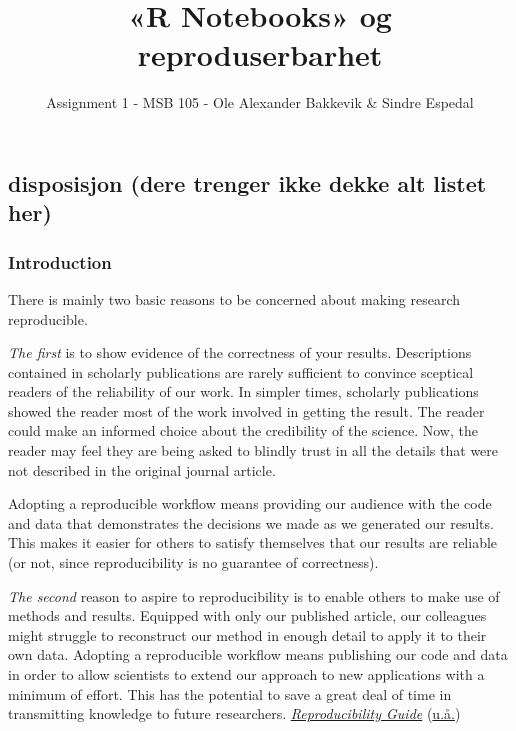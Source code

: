 \documentclass[
  12pt,
  norsk,
]{article}
\title{«R Notebooks» og reproduserbarhet}
\author{Assignment 1 - MSB 105 - Ole Alexander Bakkevik \& Sindre
Espedal}
\date{}
\begin{document}
\maketitle

\hypertarget{disposisjon-dere-trenger-ikke-dekke-alt-listet-her}{%
\subsection{disposisjon (dere trenger ikke dekke alt listet
her)}\label{disposisjon-dere-trenger-ikke-dekke-alt-listet-her}}

\hypertarget{introduction}{%
\subsubsection{Introduction}\label{introduction}}

There is mainly two basic reasons to be concerned about making research
reproducible.

\emph{The first} is to show evidence of the correctness of your results.
Descriptions contained in scholarly publications are rarely sufficient
to convince sceptical readers of the reliability of our work. In simpler
times, scholarly publications showed the reader most of the work
involved in getting the result. The reader could make an informed choice
about the credibility of the science. Now, the reader may feel they are
being asked to blindly trust in all the details that were not described
in the original journal article.

Adopting a reproducible workflow means providing our audience with the
code and data that demonstrates the decisions we made as we generated
our results. This makes it easier for others to satisfy themselves that
our results are reliable (or not, since reproducibility is no guarantee
of correctness).

\emph{The second} reason to aspire to reproducibility is to enable
others to make use of methods and results. Equipped with only our
published article, our colleagues might struggle to reconstruct our
method in enough detail to apply it to their own data. Adopting a
reproducible workflow means publishing our code and data in order to
allow scientists to extend our approach to new applications with a
minimum of effort. This has the potential to save a great deal of time
in transmitting knowledge to future researchers.
\protect\hyperlink{ref-Git-reproducabilty}{\emph{Reproducibility Guide}}
(\protect\hyperlink{ref-Git-reproducabilty}{u.å.})
\end{document}
